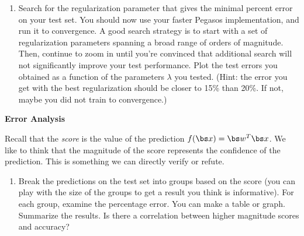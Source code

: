 \documentclass{article}
\newcommand{\nyuparagraph}[1]{\textcolor{nyupurple}{\large #1}}
\theoremstyle{plain}
\theoremstyle{definition}
\begin{document}
\begin{enumerate}
\item Search for the regularization parameter that gives the minimal percent error
on your test set. You should now use your faster Pegasos implementation,
and run it to convergence. A good search strategy is to start with
a set of regularization parameters spanning a broad range of orders
of magnitude. Then, continue to zoom in until you're convinced that
additional search will not significantly improve your test performance.
Plot the test errors you obtained as a function of the parameters $\lambda$ you tested. (Hint: the error you get with the best regularization should be closer to 15\% than 20\%. If not, maybe you did not train to convergence.)\\

\setcounter{saveenum}{\value{enumi}}
\end{enumerate}

\nyuparagraph{\bf Error Analysis}

Recall that the \emph{score} is the value of the prediction
$f(\bs x)=\bs w^{T} \bs x$. We like to think that the magnitude of the score represents
the confidence of the prediction. This is something we can directly
verify or refute.

\begin{enumerate}
  \setcounter{enumi}{\value{saveenum}}
\item  Break the predictions on the test set into groups based on the score
(you can play with the size of the groups to get a result you think
is informative). For each group, examine the percentage error. You
can make a table or graph. Summarize the results. Is there a correlation
between higher magnitude scores and accuracy?\\


\setcounter{saveenum}{\value{enumi}}
\end{enumerate}

\end{document}
